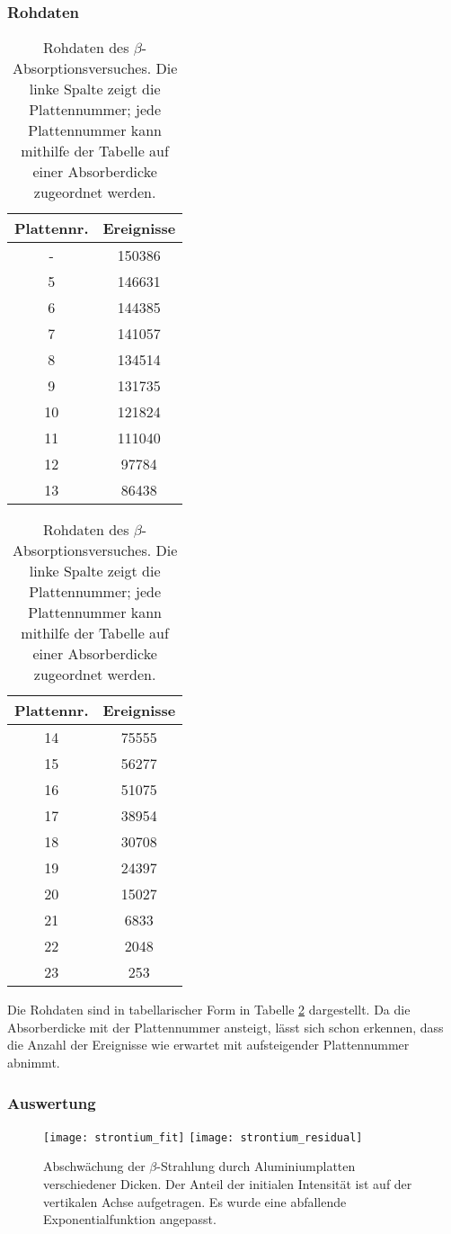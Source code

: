 \documentclass{../Misc/MontavonLaTeX/Montavon}
\newcommand{\halfwidth}{0.48\textwidth}
\begin{document}
\subsubsection{Rohdaten}
\begin{table}[htbp]
\centering
\begin{tabular}{|c|c|}
\hline
Plattennr. & Ereignisse \\
\hline
- & 150386 \\
5 & 146631 \\
6 & 144385 \\
7 & 141057 \\
8 & 134514 \\
9 & 131735 \\
10 & 121824 \\
11 & 111040 \\
12 & 97784 \\
13 & 86438 \\
\hline
\end{tabular}
\begin{tabular}{|c|c|}
\hline
Plattennr. & Ereignisse \\
\hline
14 & 75555 \\
15 & 56277 \\
16 & 51075 \\
17 & 38954 \\
18 & 30708 \\
19 & 24397 \\
20 & 15027 \\
21 & 6833 \\
22 & 2048 \\
23 & 253 \\
\hline
\end{tabular}
\caption{Rohdaten des $\beta$-Absorptionsversuches. Die linke Spalte zeigt die Plattennummer; jede Plattennummer kann mithilfe der Tabelle auf \cite[S. 25]{anleitung} einer Absorberdicke zugeordnet werden.}
\label{tbl:strontium_raw}
\end{table}

Die Rohdaten sind in tabellarischer Form in Tabelle \ref{tbl:strontium_raw} dargestellt. Da die Absorberdicke mit der Plattennummer ansteigt, lässt sich schon erkennen, dass die Anzahl der Ereignisse wie erwartet mit aufsteigender Plattennummer abnimmt.

\subsubsection{Auswertung}
\begin{figure}[htbp]
\centering
\texttt{[image: strontium\_fit]}
\texttt{[image: strontium\_residual]}
\caption{Abschwächung der  $\beta$-Strahlung durch Aluminiumplatten verschiedener Dicken. Der Anteil der initialen Intensität ist auf der vertikalen Achse aufgetragen. Es wurde eine abfallende Exponentialfunktion angepasst.}
\label{fig:strontium_fit}
\end{figure}
\end{document}
